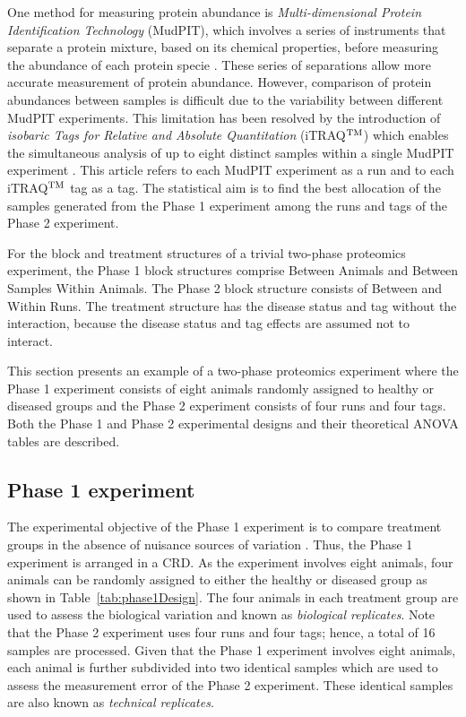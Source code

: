 \documentclass[article]{jss}
\begin{document}
One method for measuring protein abundance is \emph{Multi-dimensional Protein Identification Technology} (MudPIT), which involves a series of instruments that separate a protein mixture, based on its chemical properties, before measuring the abundance of each protein specie \citep{Florens2006a}. These series of separations allow more accurate measurement of protein abundance. However, comparison of protein abundances between samples is difficult due to the variability between different MudPIT experiments. This limitation has been resolved by the introduction of \emph{isobaric Tags for Relative and Absolute Quantitation} (iTRAQ$^{\rm TM}$) which enables the simultaneous analysis of up to eight distinct samples within a single MudPIT experiment \citep{Ross2004, Choe2007}. This article refers to each MudPIT experiment as a run and to each iTRAQ$^{\rm TM}$ tag as a tag. The statistical aim is to find the best allocation of the samples generated from the Phase 1 experiment among the runs and tags of the Phase 2 experiment.

For the block and treatment structures of a trivial two-phase proteomics experiment, the Phase 1 block structures comprise Between Animals and Between Samples Within Animals. The Phase 2 block structure consists of Between and Within Runs. The treatment structure has the disease status and tag without the interaction, because the disease status and tag effects are assumed not to interact. 

This section presents an example of a two-phase proteomics experiment where the Phase 1 experiment consists of eight animals randomly assigned to healthy or diseased groups and the Phase 2 experiment consists of four runs and four tags. Both the Phase 1 and Phase 2 experimental designs and their theoretical ANOVA tables are described. 

\subsection{Phase 1 experiment}
\label{subsec:Phase1Exp}
The experimental objective of the Phase 1 experiment is to compare treatment groups in the absence of nuisance sources of variation \citep{Mead1988}. Thus, the Phase 1 experiment is arranged in a CRD. As the experiment involves eight animals, four animals can be randomly assigned to either the healthy or diseased group as shown in Table~\ref{tab:phase1Design}. The four animals in each treatment group are used to assess the biological variation and known as \emph{biological replicates}. Note that the Phase 2 experiment uses four runs and four tags; hence, a total of 16 samples are processed. Given that the Phase 1 experiment involves eight animals, each animal is further subdivided into two identical samples which are used to assess the measurement error of the Phase 2 experiment. These identical samples are also known as \emph{technical replicates}.
\end{document}
